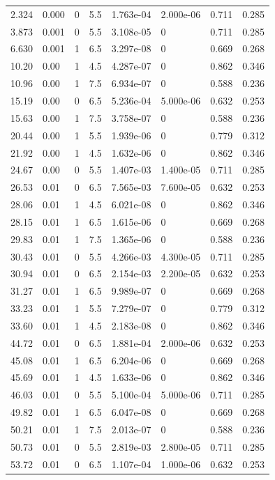 \documentclass[preview]{standalone}
\begin{document}
{{\begin{tabular}{L{1.2cm}C{1.2cm} C{0.3cm}C{0.5cm} C{1.4cm}C{1.4cm} C{1.4cm}C{1.4cm}}
  2.324  &  0.000  & 0     & 5.5 &  1.763e-04  & 2.000e-06  & 0.711 &  0.285   \\ 
  3.873  &  0.001  & 0     & 5.5 &  3.108e-05  & 0  & 0.711 &  0.285   \\ 
  6.630  &  0.001  & 1     & 6.5 &  3.297e-08  & 0  & 0.669 &  0.268   \\ 
  10.20  &  0.00  & 1     & 4.5 &  4.287e-07  & 0  & 0.862 &  0.346   \\ 
  10.96  &  0.00  & 1     & 7.5 &  6.934e-07  & 0  & 0.588 &  0.236   \\ 
  15.19  &  0.00  & 0     & 6.5 &  5.236e-04  & 5.000e-06  & 0.632 &  0.253   \\ 
  15.63  &  0.00  & 1     & 7.5 &  3.758e-07  & 0  & 0.588 &  0.236   \\ 
  20.44  &  0.00  & 1     & 5.5 &  1.939e-06  & 0  & 0.779 &  0.312   \\ 
  21.92  &  0.00  & 1     & 4.5 &  1.632e-06  & 0  & 0.862 &  0.346   \\ 
  24.67  &  0.00  & 0     & 5.5 &  1.407e-03  & 1.400e-05  & 0.711 &  0.285   \\ 
  26.53  &  0.01  & 0     & 6.5 &  7.565e-03  & 7.600e-05  & 0.632 &  0.253   \\ 
  28.06  &  0.01  & 1     & 4.5 &  6.021e-08  & 0  & 0.862 &  0.346   \\ 
  28.15  &  0.01  & 1     & 6.5 &  1.615e-06  & 0  & 0.669 &  0.268   \\ 
  29.83  &  0.01  & 1     & 7.5 &  1.365e-06  & 0  & 0.588 &  0.236   \\ 
  30.43  &  0.01  & 0     & 5.5 &  4.266e-03  & 4.300e-05  & 0.711 &  0.285   \\ 
  30.94  &  0.01  & 0     & 6.5 &  2.154e-03  & 2.200e-05  & 0.632 &  0.253   \\ 
  31.27  &  0.01  & 1     & 6.5 &  9.989e-07  & 0  & 0.669 &  0.268   \\ 
  33.23  &  0.01  & 1     & 5.5 &  7.279e-07  & 0  & 0.779 &  0.312   \\ 
  33.60  &  0.01  & 1     & 4.5 &  2.183e-08  & 0  & 0.862 &  0.346   \\ 
  44.72  &  0.01  & 0     & 6.5 &  1.881e-04  & 2.000e-06  & 0.632 &  0.253   \\ 
  45.08  &  0.01  & 1     & 6.5 &  6.204e-06  & 0  & 0.669 &  0.268   \\ 
  45.69  &  0.01  & 1     & 4.5 &  1.633e-06  & 0  & 0.862 &  0.346   \\ 
  46.03  &  0.01  & 0     & 5.5 &  5.100e-04  & 5.000e-06  & 0.711 &  0.285   \\ 
  49.82  &  0.01  & 1     & 6.5 &  6.047e-08  & 0  & 0.669 &  0.268   \\ 
  50.21  &  0.01  & 1     & 7.5 &  2.013e-07  & 0  & 0.588 &  0.236   \\ 
  50.73  &  0.01  & 0     & 5.5 &  2.819e-03  & 2.800e-05  & 0.711 &  0.285   \\ 
  53.72  &  0.01  & 0     & 6.5 &  1.107e-04  & 1.000e-06  & 0.632 &  0.253   \\ 
\hline 
\end{tabular} 

}}
\end{document}
